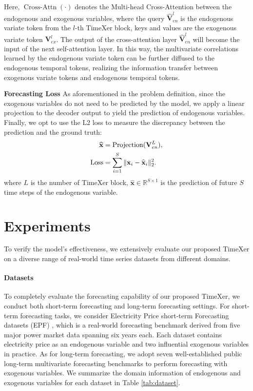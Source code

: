 \documentclass[nohyperref]{article}
\theoremstyle{plain}
\theoremstyle{definition}
\theoremstyle{remark}
\begin{document}
Here, $\operatorname{Cross-Attn} (\cdot)$ denotes the Multi-head Cross-Attention between the endogenous and exogenous variables, where the query $\mathbf{\widehat{V}}^{l}_{en}$ is the endogenous variate token from the $l$-th TimeXer block, keys and values are the exogenous variate token $\mathbf{V}^{l}_{ex}$.
The output of the cross-attention layer $\mathbf{\widehat{V}}^{l}_{en}$  will become the input of the next self-attention layer. In this way, the multivariate correlations learned by the endogenous variate token can be further diffused to the endogenous temporal tokens, realizing the information transfer between exogenous variate tokens and endogenous temporal tokens.



\textbf{Forecasting Loss} As aforementioned in the problem definition, since the exogenous variables do not need to be predicted by the model, we apply a linear projection to the decoder output to yield the prediction of endogenous variables. Finally, we opt to use the L2 loss to measure the discrepancy between the prediction and the ground truth:
\begin{equation}
    \begin{aligned}
        \mathbf{\widehat{x}} &= {\rm{Projection}}(\mathbf{V}^{L}_{en}), \\
        \rm{Loss} &= \sum_{i=1}^{S}\|\mathbf{x}_{i}-\widehat{\mathbf{x}}_{i}\|_{2}^{2}.
    \end{aligned}
\end{equation}
where $L$ is the number of TimeXer block, $\mathbf{\widehat{x}} \in \mathbb{R}^{S\times 1}$ is the prediction of  future $S$ time steps of the endogenous variable.


\section{Experiments}
To verify the model's effectiveness, we extensively evaluate our proposed TimeXer on a diverse range of real-world time series datasets from different domains.


\paragraph{Datasets} To completely evaluate the forecasting capability of our proposed TimeXer, we conduct both short-term forecasting and long-term forecasting settings. For short-term forecasting tasks, we consider Electricity Price short-term Forecasting datasets (EPF) \cite{lago2021forecasting}, which is a real-world forecasting benchmark derived from five major power market data spanning six years each. Each dataset contains electricity price as an endogenous variable and two influential exogenous variables in practice. As for long-term forecasting, we adopt seven well-established public long-term multivariate forecasting benchmarks to perform forecasting with exogenous variables. We summarize the domain information of endogenous and exogenous variables for each dataset in Table \ref{tab:dataset}.
\end{document}
